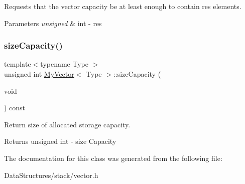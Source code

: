 Requests that the vector capacity be at least enough to contain res elements. 


\begin{DoxyParams}{Parameters}
{\em unsigned} & int -\/ res \\
\hline
\end{DoxyParams}
\mbox{\label{classMyVector_acf22be00b40145fef2f9dc7a63511995}} 
\subsubsection{\texorpdfstring{size\+Capacity()}{sizeCapacity()}}
{\footnotesize\ttfamily template$<$typename Type $>$ \\
unsigned int \hyperlink{classMyVector}{My\+Vector}$<$ Type $>$\+::size\+Capacity (\begin{DoxyParamCaption}\item[{void}]{ }\end{DoxyParamCaption}) const}



Return size of allocated storage capacity. 

\begin{DoxyReturn}{Returns}
unsigned int -\/ size Capacity 
\end{DoxyReturn}


The documentation for this class was generated from the following file\+:\begin{DoxyCompactItemize}
\item 
Data\+Structures/stack/vector.\+h\end{DoxyCompactItemize}
